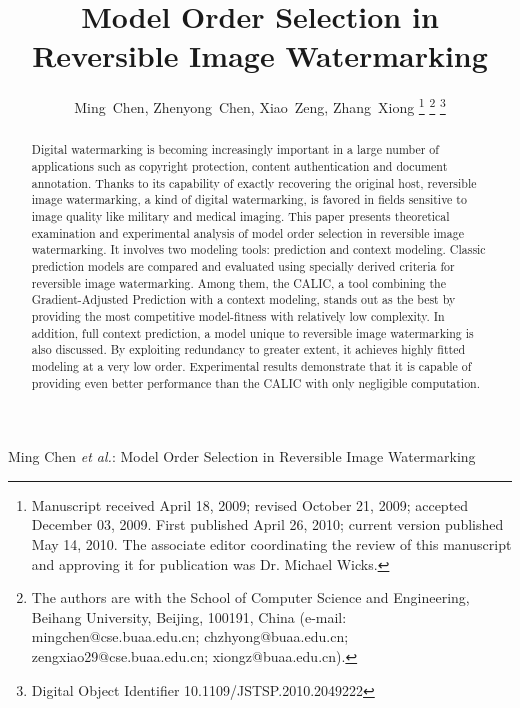 \documentclass[journal]{IEEEtran}
\begin{document}
\title{Model Order Selection in Reversible Image Watermarking}
\author{Ming~Chen,
        Zhenyong~Chen,
	Xiao~Zeng,
	Zhang~Xiong
\thanks{Manuscript received April 18, 2009; revised October 21, 2009; accepted December 03, 2009.
First published April 26, 2010; current version published May 14, 2010. The associate editor
coordinating the review of this manuscript and approving it for publication was Dr. Michael
Wicks.}%
\thanks{The authors are with the School of Computer Science and Engineering, Beihang University,
Beijing, 100191, China (e-mail: mingchen@cse.buaa.edu.cn; chzhyong@buaa.edu.cn;
zengxiao29@cse.buaa.edu.cn; xiongz@buaa.edu.cn).}%
\thanks{Digital Object Identifier 10.1109/JSTSP.2010.2049222}}


%
{Ming Chen \MakeLowercase{\textit{et al.}}: Model Order Selection in Reversible Image Watermarking}

\maketitle

\begin{abstract}

Digital watermarking is becoming increasingly important in a large number of applications such as
copyright protection, content authentication and document annotation. Thanks to its capability of
exactly recovering the original host, reversible image watermarking, a kind of digital watermarking,
is favored in fields sensitive to image quality like military and medical imaging. This paper
presents theoretical examination and experimental analysis of model order selection in reversible
image watermarking. It involves two modeling tools: prediction and context modeling. Classic
prediction models are compared and evaluated using specially derived criteria for reversible image
watermarking. Among them, the CALIC, a tool combining the Gradient-Adjusted Prediction with a
context modeling, stands out as the best by providing the most competitive model-fitness with
relatively low complexity. In addition, full context prediction, a model unique to reversible image
watermarking is also discussed. By exploiting redundancy to greater extent, it achieves highly
fitted modeling at a very low order. Experimental results demonstrate that it is capable of
providing even better performance than the CALIC with only negligible computation. 

\end{abstract}
\end{document}
